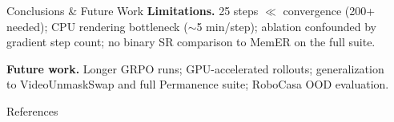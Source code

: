 \documentclass[final]{beamer}
\newlength{\sepwidth}
\newlength{\colwidth}
\newcommand{\separatorcolumn}{\begin{column}{\sepwidth}\end{column}}
\begin{document}
\begin{frame}[t]
\begin{columns}[t]
\begin{column}{\colwidth}
\begin{block}{Conclusions \& Future Work}
    \vspace{0.3em}
    \textbf{Limitations.} 25 steps $\ll$ convergence (200+ needed); CPU rendering bottleneck (${\sim}$5 min/step); ablation confounded by gradient step count; no binary SR comparison to MemER on the full suite.

    \vspace{0.3em}
    \textbf{Future work.} Longer GRPO runs; GPU-accelerated rollouts; generalization to VideoUnmaskSwap and full Permanence suite; RoboCasa OOD evaluation.

  \end{block}

  \begin{block}{References}
    \tiny
    \nocite{pi05_2024, qwen3vl, grpo_2024, ppo_schulman, robomme, maniskill, memer, mem}
    
    
  \end{block}

\end{column}

\separatorcolumn
\end{columns}
\end{frame}
\end{document}
